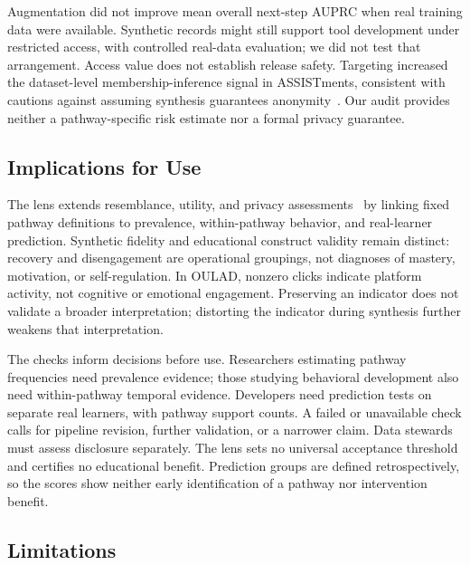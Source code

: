 \documentclass[fleqn,10pt]{JLA_article}
\begin{document}
Augmentation did not improve mean overall next-step AUPRC when real training data were available. Synthetic records might still support tool development under restricted access, with controlled real-data evaluation; we did not test that arrangement. Access value does not establish release safety. Targeting increased the dataset-level membership-inference signal in ASSISTments, consistent with cautions against assuming synthesis guarantees anonymity~\cite{stadler2022synthetic,vie2022privacy,vanbreugel2023membership}. Our audit provides neither a pathway-specific risk estimate nor a formal privacy guarantee.

\subsection{Implications for Use}

The lens extends resemblance, utility, and privacy assessments~\cite{liu2024scaling,liu2025ensuring} by linking fixed pathway definitions to prevalence, within-pathway behavior, and real-learner prediction. Synthetic fidelity and educational construct validity remain distinct: recovery and disengagement are operational groupings, not diagnoses of mastery, motivation, or self-regulation. In OULAD, nonzero clicks indicate platform activity, not cognitive or emotional engagement. Preserving an indicator does not validate a broader interpretation; distorting the indicator during synthesis further weakens that interpretation.

The checks inform decisions before use. Researchers estimating pathway frequencies need prevalence evidence; those studying behavioral development also need within-pathway temporal evidence. Developers need prediction tests on separate real learners, with pathway support counts. A failed or unavailable check calls for pipeline revision, further validation, or a narrower claim. Data stewards must assess disclosure separately. The lens sets no universal acceptance threshold and certifies no educational benefit. Prediction groups are defined retrospectively, so the scores show neither early identification of a pathway nor intervention benefit.

\subsection{Limitations}
\end{document}
